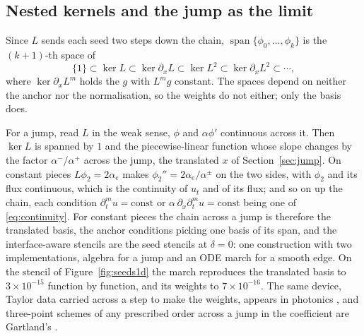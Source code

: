 \documentclass[11pt]{amsart}
\theoremstyle{definition}
\theoremstyle{remark}
\newcommand{\px}{\partial_x}
\newcommand{\pt}{\partial_t}
\newcommand{\sci}[2]{#1 \times 10^{#2}}
\begin{document}
\subsection{Nested kernels and the jump as the limit}
\label{sec:jumplimit}
Since $L$ sends each seed two steps down the chain,
$\operatorname{span}\{\phi_0, \ldots, \phi_k\}$ is the $(k + 1)$-th space
of
\begin{equation}
  \label{eq:nested}
  \{1\} \subset \ker L \subset \ker \px L \subset \ker L^2 \subset
  \ker \px L^2 \subset \cdots,
\end{equation}
where $\ker \px L^m$ holds the $g$ with $L^m g$ constant. The spaces depend
on neither the anchor nor the normalisation, so the weights do not either;
only the basis does.

For a jump, read $L$ in the weak sense, $\phi$ and $\alpha \phi'$
continuous across it. Then $\ker L$ is spanned by $1$ and the
piecewise-linear function whose slope changes by the factor
$\alpha^- / \alpha^+$ across the jump, the translated $x$ of
Section~\ref{sec:jump}. On constant pieces $L \phi_2 = 2 \alpha_e$ makes
$\phi_2'' = 2 \alpha_e / \alpha^\pm$ on the two sides, with $\phi_2$ and its
flux continuous, which is the continuity of $u_t$ and of its flux; and so
on up the chain, each condition $\pt^m u = \text{const}$ or
$\alpha\, \px \pt^m u = \text{const}$ being one of \eqref{eq:continuity}.
For constant pieces the chain across a jump is therefore the translated
basis, the anchor conditions picking one basis of its span, and the
interface-aware stencils are the seed stencils at $\delta = 0$: one
construction with two implementations, algebra for a jump and an ODE march
for a smooth edge. On the stencil of Figure~\ref{fig:seeds1d} the march
reproduces the translated basis to $\sci{3}{-15}$ function by function, and
its weights to $\sci{7}{-16}$. The same device, Taylor data carried across
a step to make the weights, appears in photonics \cite{Sujecki2010}, and
three-point schemes of any prescribed order across a jump in the
coefficient are Gartland's \cite{Gartland1989}.
\end{document}
